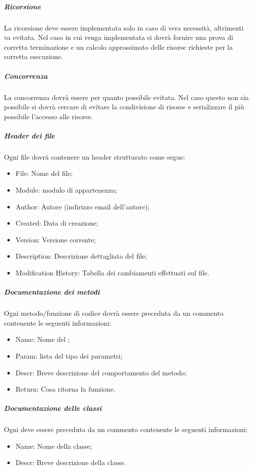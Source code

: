 \subparagraph{Ricorsione \\}
\label{}
La ricorsione deve essere implementata solo in caso di vera necessità, altrimenti va evitata. Nel caso in cui venga implementata si dovrà fornire una prova di corretta terminazione e un calcolo approssimato delle risorse richieste per la corretta esecuzione.

\subparagraph{Concorrenza \\}
\label{}

La concorrenza dovrà essere per quanto possibile evitata. Nel caso questo non sia possibile si dovrà cercare di evitare la condivisione di risorse e serializzare il più possibile l'accesso alle risorse.

\subparagraph{Header dei file \\}
\label{5.3.1}
Ogni file dovrà contenere un header strutturato come segue:
\begin{itemize}
\item File: Nome del file;
\item Module: modulo di appartenenza;
\item Author: Autore (indirizzo email dell'autore);
\item Created: Data di creazione;
\item Version: Versione corrente;
\item Description: Descrizione dettagliata del file;
\item Modification History: Tabella dei cambiamenti effettuati sul file.
\end{itemize}

\subparagraph{Documentazione dei metodi \\}
\label{5.3.2}
Ogni metodo/funzione di codice dovrà essere preceduta da un commento contenente le seguenti informazioni:
\begin{itemize}
\item Name: Nome del ;
\item Param: lista del tipo dei parametri;
\item Descr: Breve descrizione del comportamento del metodo;
\item Return: Cosa ritorna la funzione.
\end{itemize}

\subparagraph{Documentazione delle classi \\}
\label{5.3.3}
Ogni  deve essere preceduta da un commento contenente le seguenti informazioni:
\begin{itemize}
\item Name: Nome della classe;
\item Descr: Breve descrizione della classe.
\end{itemize}

